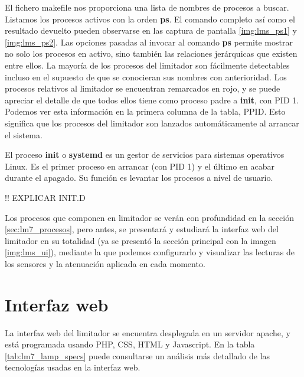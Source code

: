 El fichero \gls{makefile} nos proporciona una lista de nombres de procesos a buscar. Listamos los procesos activos con la orden \textbf{ps}. El comando completo así como el resultado devuelto pueden observarse en las captura de pantalla \ref{img:lms_ps1} y \ref{img:lms_ps2}. Las opciones pasadas al invocar al comando \textbf{ps} permite mostrar no solo los procesos en activo, sino también las relaciones jerárquicas que existen entre ellos. La mayoría de los procesos del limitador son fácilmente detectables incluso en el supuesto de que se conocieran sus nombres con anterioridad. Los procesos relativos al limitador se encuentran remarcados en rojo, y se puede apreciar el detalle de que todos ellos tiene como proceso padre  a \textbf{init}, con \acrshort{PID} 1. Podemos ver esta información en la primera columna de la tabla, \acrshort{PPID}. Esto significa que los procesos del limitador son lanzados automáticamente al arrancar el sistema.

\begin{shaded}
    \noindent
    El proceso \textbf{init} o \textbf{systemd} es un gestor de servicios para sistemas operativos Linux. Es el primer proceso en arrancar (con \acrshort{PID} 1) y el último en acabar durante el apagado. Su función es levantar los procesos a nivel de usuario.
\end{shaded}

!! EXPLICAR INIT.D

Los procesos que componen en limitador se verán con profundidad en la sección \ref{sec:lm7_procesos}, pero antes, se presentará y estudiará la interfaz web del limitador en su totalidad (ya se presentó la sección principal con la imagen \ref{img:lms_ui}), mediante la que podemos configurarlo y visualizar las lecturas de los sensores y la atenuación aplicada en cada momento.

\section{Interfaz web}

La interfaz web del limitador se encuentra desplegada en un servidor \gls{apache}, y está programada usando PHP, \acrshort{CSS}, HTML y Javascript. En la tabla \ref{tab:lm7_lamp_specs} puede consultarse un análisis más detallado de las tecnologías usadas en la interfaz web.

